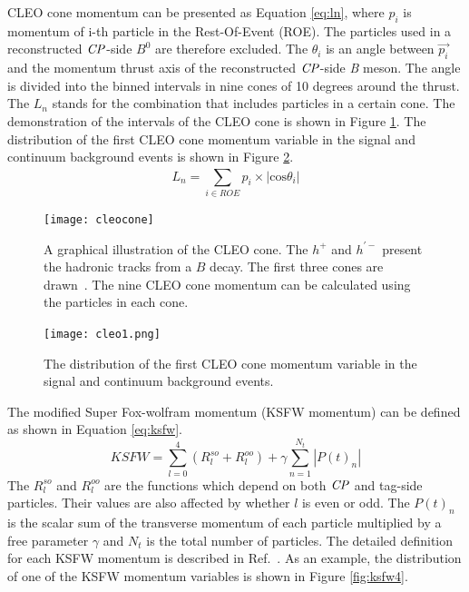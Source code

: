 CLEO cone momentum can be presented as Equation \ref{eq:ln}, where $ p_i $ is momentum of i-th particle in the Rest-Of-Event (ROE). The particles used in a reconstructed $\it{CP}$-side $B^0$ are therefore excluded. The $\theta_i$ is an angle between $\vec{p_i}$ and the momentum thrust axis of the reconstructed $\it{CP}$-side \textit{B} meson. The angle is divided into the binned intervals in nine cones of 10 degrees around the thrust.  The $L_n$ stands for the combination that includes particles in a certain cone. The demonstration of the intervals of the CLEO cone is shown in Figure \ref{fig:cleocone}. The distribution of the first CLEO cone momentum variable in the signal and continuum background events is shown in Figure \ref{fig:cleo1}.
\begin{equation}\label{eq:ln}
L_n = \sum_{i\in ROE}^{} p_i \times |\text{cos}\theta_i|
\end{equation}

\begin{figure}[htpb]
\centering
\texttt{[image: cleocone]}
\caption{A graphical illustration of the CLEO cone. The $h^+$ and $h^{'-}$ present the hadronic tracks from a $B$ decay. The first three cones are drawn~\cite{Bevan_2014}. The nine CLEO cone momentum can be calculated using the particles in each cone. }
\label{fig:cleocone}
\end{figure}
\begin{figure}[htpb]
	\centering
	\texttt{[image: cleo1.png]}
	\caption{The distribution of the first CLEO cone momentum variable in the signal and continuum background events.}
	\label{fig:cleo1}
\end{figure}

The modified Super Fox-wolfram momentum (KSFW momentum) can be defined as shown in Equation \ref{eq:ksfw}.
\begin{equation}\label{eq:ksfw}
KSFW = \sum_{l=0}^{4}( R_l^{so} + R_l^{oo}) + \gamma \sum_{n=1}^{N_t}|P(t)_n|
\end{equation} 
The $R_l^{so}$ and $R_l^{oo}$ are the functions which depend on both $\it{CP}$ and tag-side particles. Their values are also affected by whether $l$ is even or odd. The $P(t)_n$ is the scalar sum of the transverse momentum of
each particle multiplied by a free parameter $\gamma$ and $N_t$ is
the total number of particles. The detailed  definition for each KSFW momentum is described in Ref.~\cite{Bevan_2014}. As an example, the distribution of one of the KSFW momentum variables is shown in Figure \ref{fig:ksfw4}.

